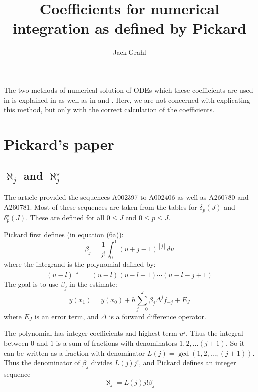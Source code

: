 \documentclass{article}
\title{Coefficients for numerical integration as defined by Pickard}
\author{Jack Grahl}
\begin{document}
\maketitle
{}

The two methods of numerical solution of ODEs which these coefficients are used in is explained in \cite{pickard} as well as in \cite{collatz} and \cite{henrici}.
Here, we are not concerned with explicating this method, but only with the correct calculation of the coefficients.
\section{Pickard's paper}
\subsection{$\aleph_j$ and $\aleph^{\star}_j$}
The article \cite{pickard} provided the sequences A002397 to A002406 as well as A260780 and A260781. Most of these sequences are taken from the tables for $\delta_p(J)$ and $\delta^{\star}_p(J)$. These are defined for all $0 \leq J$ and $0 \leq p \leq J$.

Pickard first defines (in equation (6a)):
\begin{equation}\label{eqn:beta_integral}
 \beta_j = \frac{1}{j!}\int_0^1 (u + j - 1)^{[j]} du 
\end{equation}
where the integrand is the polynomial defined by:
\[ (u - l)^{[j]} = (u - l)(u - l - 1)\cdots(u - l - j + 1) \]
The goal is to use $\beta_j$ in the estimate:
\[ y(x_1) = y(x_0) + h\sum_{j=0}^{J} \beta_j \Delta^{j}f_{-j} + E_{J} \]
where $E_J$ is an error term, and $\Delta$ is a forward difference operator.

The polynomial has integer coefficients and highest term $u^{j}$.
Thus the integral between $0$ and $1$ is a sum of fractions with denominators $1, 2, \ldots (j+1)$.
So it can be written as a fraction with denominator $L(j) = \gcd(1, 2, \ldots, (j+1))$.
Thus the denominator of $\beta_j$ divides $L(j)j!$, and Pickard defines an integer sequence
\begin{equation}\label{eqn:aleph}
 \aleph_j = L(j)j!\beta_j 
\end{equation}
\end{document}
